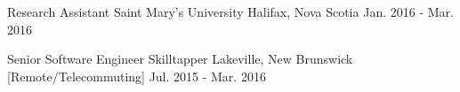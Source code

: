 

\begin{cventries}

  \cventry
    {Research Assistant} %
    {Saint Mary's University} %
    {Halifax, Nova Scotia} %
    {Jan. 2016 - Mar. 2016} %
    {
    }

  \cventry
    {Senior Software Engineer} %
    {Skilltapper} %
    {Lakeville, New Brunswick [Remote/Telecommuting]} %
    {Jul. 2015 - Mar. 2016} %
    {
    }


\end{cventries}

